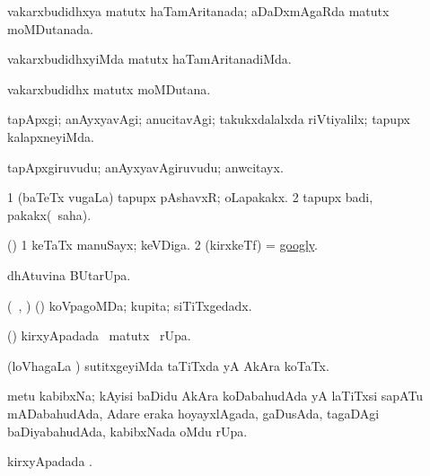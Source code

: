 \bentry
{} 
\gl{\gu}
\expl{}
\bmng
vakarxbudidhxya matutx haTamAritanada; aDaDxmAgaRda matutx moMDutanada. 
\emng
\eentry

\bentry
{} 
\gl{\kirxvi}
\expl{}
\bmng
vakarxbudidhxyiMda matutx haTamAritanadiMda. 
\emng
\eentry

\bentry
{} 
\gl{\nA}
\expl{}
\bmng
vakarxbudidhx matutx moMDutana. 
\emng
\eentry

\bentry
{} 
\gl{\kirxvi}
\expl{}
\bmng
tapApxgi; anAyxyavAgi; anucitavAgi; takukxdalalxda riVtiyalilx; tapupx kalapxneyiMda. 
\emng
\eentry

\bentry
{} 
\gl{\nA}
\expl{}
\bmng
tapApxgiruvudu; anAyxyavAgiruvudu; anwcitayx. 
\emng
\eentry

\bentry
{} 
\gl{\nA}
\expl{}
\bmng
\bnum
\num{1} (baTeTx \mo vugaLa) tapupx pAshavxR; oLapakakx. 
\num{2} tapupx badi, pakakx(\rUpa\ saha). 
\enum
\emng
\eentry

\bentry
{} 
\gl{\nA}
\expl{}
\bmng
(\AmA) 
\bnum
\num{1} keTaTx manuSayx; keVDiga. 
\num{2} (kirxkeTf) = \hyperref{kandict_g.pdf}{G}{googly}{googly}. 
\enum
\emng
\eentry

\bentry
{} 
\gl{\kirx}
\expl{}
\bmng
{} dhAtuvina BUtarUpa. 
\emng
\eentry

\bentry
{} 
\gl{\gu}
\expl{}
\bmng
(\rUpa\, \kAparx, \hA) (\pArxparx) koVpagoMDa; kupita; siTiTxgedadx. 
\emng
\eentry

\bentry
{} 
\gl{\kirx}
\expl{}
\bmng
(\pArxparx)  kirxyApadada \BU\ matutx \BUkaq\ rUpa. 
\emng
\eentry

\bentry
{} 
\gl{\gu}
\expl{}
\bmng
(loVhagaLa \vi) sutitxgeyiMda taTiTxda yA AkAra koTaTx. 
\emng
\eentry

\bentry
{} 
\gl{\nA}
\expl{}
\bmng
metu kabibxNa; kAyisi baDidu AkAra koDabahudAda yA laTiTxsi sapATu mADabahudAda, Adare eraka hoyayxlAgada, gaDusAda, tagaDAgi baDiyabahudAda, kabibxNada oMdu rUpa. 
\emng
\eentry

\bentry
{} 
\gl{\kirx}
\expl{}
\bmng
{} kirxyApadada \BUkaq. 
\emng
\eentry

\bentry
{} 
\gl{\saMkiSx}
\expl{}
\bmng
\eng{(} \birx\  
\emng
\eentry

